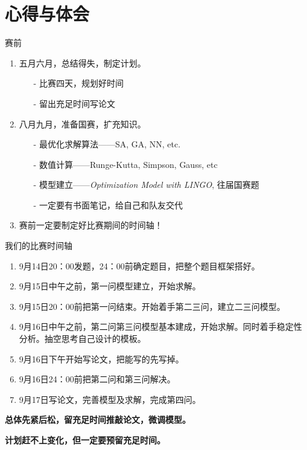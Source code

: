 \documentclass{beamer}
\begin{document}
\section{心得与体会}
\begin{frame}{赛前}
	\begin{enumerate}
	  \item 五月六月，总结得失，制定计划。
		\begin{enumerate}
		  \item[-] 比赛四天，规划好时间
		  \item[-] 留出充足时间写论文
		\end{enumerate}
	  \item 八月九月，准备国赛，扩充知识。
		\begin{enumerate}
		  \item[-] 最优化求解算法——SA, GA, NN, etc.
		  \item[-] 数值计算——Runge-Kutta, Simpson, Gauss, etc
		  \item[-] 模型建立——\emph{Optimization Model with LINGO}, 往届国赛题
		  \item[-] 一定要有书面笔记，给自己和队友交代
		\end{enumerate}
	  \item 赛前一定要制定好比赛期间的时间轴！
	\end{enumerate}
\end{frame}

\begin{frame}{我们的比赛时间轴}
	\begin{enumerate}
	  \item \small 9月14日20：00发题，24：00前确定题目，把整个题目框架搭好。
	  \item \small 9月15日中午之前，第一问模型建立，开始求解。
	  \item \small 9月15日20：00前把第一问结束。开始着手第二三问，建立二三问模型。
	  \item \small 9月16日中午之前，第二问第三问模型基本建成，开始求解。同时着手稳定性分析。抽空思考自己设计的模板。
	  \item \small 9月16日下午开始写论文，把能写的先写掉。
	  \item \small 9月16日24：00前把第二问和第三问解决。
	  \item \small 9月17日写论文，完善模型及求解，完成第四问。
	\end{enumerate}
	\begin{center}
	  \textbf{总体先紧后松，留充足时间推敲论文，微调模型。}
	  
	  \textbf{计划赶不上变化，但一定要预留充足时间。}
	\end{center}
\end{frame}
\end{document}
